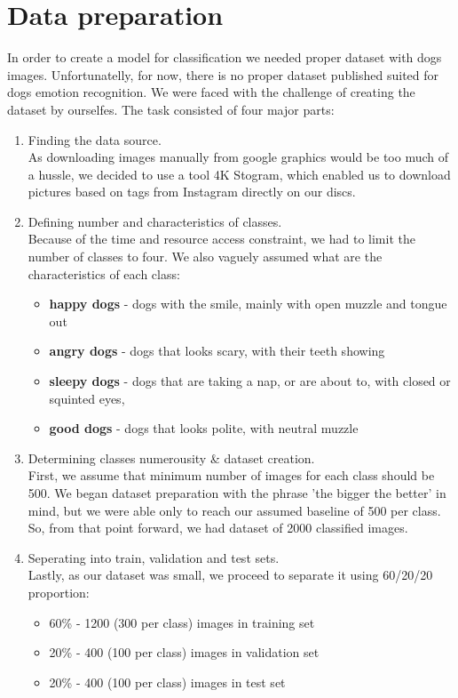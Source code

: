 \documentclass[11pt]{diazessay} %
\begin{document}
\section*{Data preparation}
In order to create a model for classification we needed proper dataset with dogs images. Unfortunatelly, for now, there is no proper dataset published suited for dogs emotion recognition. We were faced with the challenge of creating the dataset by ourselfes. The task consisted of four major parts:
\begin{enumerate}
	\item Finding the data source. \\
	As downloading images manually from google graphics would be too much of a hussle, we decided to use a tool 4K Stogram, which enabled us to download pictures based on tags from Instagram directly on our discs.
	\\
	\item Defining number and characteristics of classes. \\ 
	Because of the time and resource access constraint, we had to limit the number of classes to four. We also vaguely assumed what are the characteristics of each class:
	\begin{itemize}
		\item \textbf{happy dogs} - dogs with the smile, mainly with open muzzle and tongue out
		\item \textbf{angry dogs} - dogs that looks scary, with their teeth showing
		\item \textbf{sleepy dogs} - dogs that are taking a nap, or are about to, with closed or squinted eyes,
		\item \textbf{good dogs} - dogs that looks polite, with neutral muzzle \\
	\end{itemize} 
	\item Determining classes numerousity \& dataset creation. \\ 
	First, we assume that minimum number of images for each class should be 500. We began dataset preparation with the phrase 'the bigger the better' in mind, but we were able only to reach our assumed baseline of 500 per class.
	So, from that point forward, we had dataset of 2000 classified images.\\
	\item Seperating into train, validation and test sets.\\ 
	Lastly, as our dataset was small, we proceed to separate it using 60/20/20 proportion:
	\begin{itemize}
		\item 60\% - 1200 (300 per class) images in training set
		\item 20\% - 400 (100 per class) images in validation set
		\item 20\% - 400 (100 per class) images in test set
	\end{itemize}
	
\end{enumerate}
\end{document}
